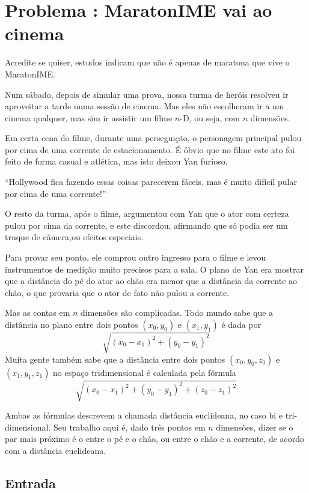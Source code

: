 \section*{Problema \proxLetra: MaratonIME vai ao cinema}

Acredite se quiser, estudos indicam que não é apenas de maratona que vive o MaratonIME. 

Num sábado, depois de simular uma prova, nossa turma de heróis resolveu ir aproveitar
a tarde numa sessão de cinema. Mas eles não escolheram ir a um cinema qualquer, mas sim
ir assistir um filme $n$-D, ou seja, com $n$ dimensões.

Em certa cena do filme, durante uma perseguição, o personagem principal pulou por cima
de uma corrente de estacionamento. É óbvio que no filme este ato foi feito de forma 
casual e atlética, mas isto deixou Yan furioso.

``Hollywood fica fazendo essas coisas parecerem fáceis, mas é muito difícil pular por
cima de uma corrente!''

O resto da turma, após o filme, argumentou com Yan que o ator com certeza pulou por cima
da corrente, e este discordou, afirmando que só podia ser um truque de câmera,ou efeitos
especiais.

Para provar seu ponto, ele comprou outro ingresso para o filme e levou instrumentos de
medição muito precisos para a sala. O plano de Yan era mostrar que a distância do pé do
ator ao chão era menor que a distância da corrente ao chão, o que provaria que o ator
de fato não pulou a corrente.

Mas as contas em $n$ dimensões são complicadas. Todo mundo sabe que a distância no plano
entre dois pontos $(x_0,y_0)$ e  $(x_1,y_1)$ é dada por
\[ \sqrt{(x_0-x_1)^2 + (y_0-y_1)^2}\]
Muita gente também sabe que a distância entre dois pontos $(x_0,y_0,z_0)$ e $(x_1,y_1,z_1)$
no espaço tridimensional é calculada pela fórmula
\[\sqrt{(x_0-x_1)^2 + (y_0-y_1)^2 + (z_0-z_1)^2}\]

Ambas as fórmulas descrevem a chamada distância euclideana, no caso bi e tri-dimensional.
Seu trabalho aqui é, dado três pontos em $n$ dimensões, dizer se o par mais próximo é o
entre o pé e o chão, ou entre o chão e a corrente, de acordo com a distância euclideana.

\subsection*{Entrada}
\textoDiversasInstanciasEOF

